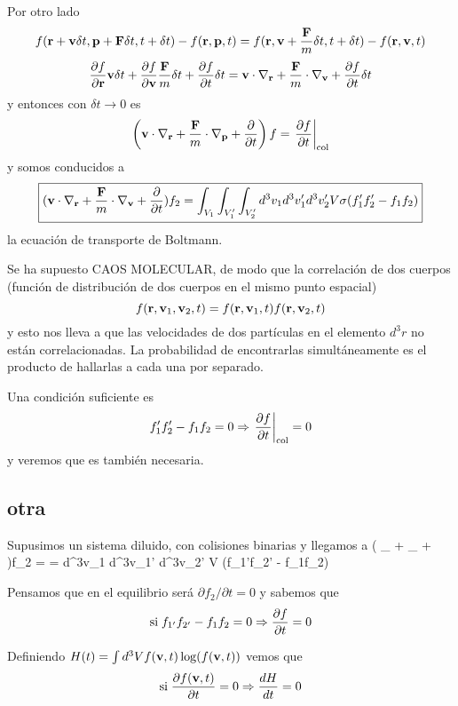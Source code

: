 \documentclass[10pt,oneside]{CBFT_book}
\begin{document}
Por otro lado
\[
	f(\vb{r} + \vb{v} \delta t, \vb{p} + \vb{F} \delta t, t + \delta t) - f(\vb{r}, \vb{p}, t) = 
	f(\vb{r},\vb{v} + \frac{\vb{F}}{m}\delta t, t + \delta t) - f(\vb{r},\vb{v}, t)
\] 
\[
	\dpar{f}{\vb{r}} \vb{v} \delta t + \dpar{f}{\vb{v}} \frac{\vb{F}}{m} \delta t + \dpar{f}{t} \delta t = 
	\vb{v}\cdot\nabla_{\vb{r}} + \frac{\vb{F}}{m}\cdot\nabla_{\vb{v}} + \dpar{f}{t} \delta t 
\]
y entonces con $\delta t \to 0$ es
\[
	\left( \vb{v}\cdot\nabla_{\vb{r}} + \frac{\vb{F}}{m}\cdot\nabla_{\vb{p}} + \dpar{}{t} \right)f =
	\left. \dpar{f}{t} \right|_{\text{col}} 
\]
y somos conducidos a
\[
	\boxed{( \vb{v}\cdot\nabla_{\vb{r}} + \frac{\vb{F}}{m}\cdot\nabla_{\vb{v}} + \dpar{}{t} )f_2 =
	\int_{V_1} \int_{V_1'} \int_{V_2'} d^3v_1 d^3v_1' d^3v_2' V \sigma 
	(f_1'f_2' - f_1f_2) }
\]
la ecuación de transporte de Boltmann.

Se ha supuesto CAOS MOLECULAR, de modo que la correlación de dos cuerpos
(función de distribución de dos cuerpos en el mismo punto espacial)
\[
	f(\vb{r},\vb{v}_1,\vb{v}_2, t) = f(\vb{r},\vb{v}_1, t) f(\vb{r},\vb{v}_2, t)
\]
y esto nos lleva a que las velocidades de dos partículas en el elemento $d^3r$
no están correlacionadas. La probabilidad de encontrarlas simultáneamente es el
producto de hallarlas a cada una por separado.

Una condición suficiente es
\[
	f_1'f_2' - f_1f_2 = 0 \Rightarrow \left. \frac{\partial^{\hspace{-0.05em}} {f}}{\partial {t}^{\hspace{-0.05em}}} \right|_{\text{col}} = 0
\]
y veremos que es también necesaria.

\subsection{otra}

Supusimos un sistema diluido, con colisiones binarias y llegamos a
\be
	\left( \cdot\nabla_{} + \cdot\nabla_{} +  \right)f_2 =
	 = \int\int\int d^3v_1 d^3v_1' d^3v_2' V \sigma (f_{1'}f_{2'} - f_1f_2)
	\label{equilibrio_fdist}
\ee

Pensamos que en el equilibrio será $\partial f_2 /\partial t = 0$ y sabemos que 
\[
	\text{si} \;  f_{1'}f_{2'} - f_1f_2 = 0  \Rightarrow  \frac{\partial^{\hspace{-0.05em}} {f}}{\partial {t}^{\hspace{-0.05em}}} = 0
\]

Definiendo $H(t) = \int d^3V f(\vb{v},t) \log( f(\vb{v},t) )$ vemos que 
\[
	\text{si} \; \dpar{f(\vb{v},t)}{t} = 0 \Rightarrow \dtot{H}{t} = 0
\]
\end{document}
